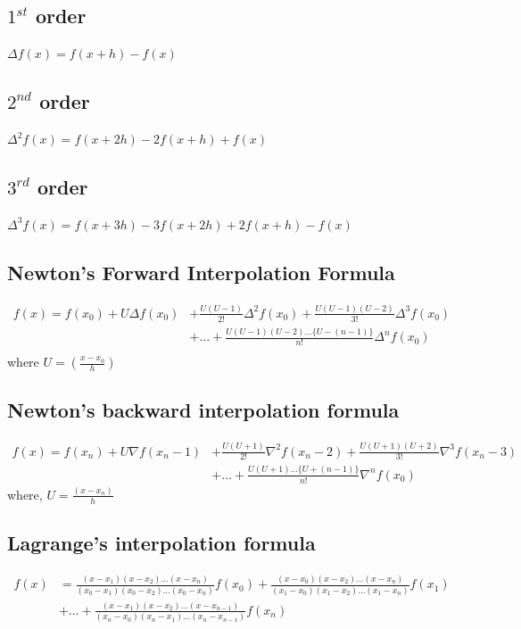 \documentclass{article}
\begin{document}
            {\parindent0pt

            \subsection*{$1^{st}$ order}
              $\Delta f(x)=f(x+h)-f(x)$
            
            \subsection*{$2^{nd}$ order}
              $\Delta^2 f(x)=f(x+2h)-2f(x+h)+f(x)$
            
            \subsection*{$3^{rd}$ order}
              $\Delta^3 f(x)=f(x+3h)-3f(x+2h)+2f(x+h)-f(x)$
            
            \subsection*{Newton's Forward Interpolation Formula}
              \begin{align*}
                f(x)=f(x_0)+U\Delta f(x_0) &+ \frac{U(U-1)}{2!}\Delta^2f(x_0)+\frac{U(U-1)(U-2)}{3!}\Delta^3f(x_0)\\
                                           &+ \dots+\frac{U(U-1)(U-2)\dots\{U-(n-1)\}}{n!}\Delta^nf(x_0)\\
              \end{align*}
              where $U=(\frac{x-x_0}{h})$
            
            \subsection*{Newton's backward interpolation formula}
              \begin{align*}
                f(x)=f(x_n)+U\nabla f(x_n-1) &+ \frac{U(U+1)}{2!}\nabla^2f(x_n-2)+\frac{U(U+1)(U+2)}{3!}\nabla^3f(x_n-3)\\
                                             &+ \dots+\frac{U(U+1)\dots\{U+(n-1)\}}{n!}\nabla^nf(x_0)
              \end{align*}
              where, $U=\frac{(x-x_n)}{h}$


            \subsection*{Lagrange's interpolation formula}
              \begin{align*}
                f(x)&=\frac{(x-x_1)(x-x_2)\dots(x-x_n)}{(x_0-x_1)(x_0-x_2)\dots(x_0-x_n)}f(x_0)+\frac{(x-x_0)(x-x_2)\dots(x-x_n)}{(x_1-x_0)(x_1-x_2)\dots(x_1-x_n)}f(x_1)\\
                &+ \dots +\frac{(x-x_1)(x-x_2)\dots(x-x_{n-1})}{(x_n-x_0)(x_n-x_1)\dots(x_n-x_{n-1})}f(x_n)
              \end{align*}
            
}
\end{document}
